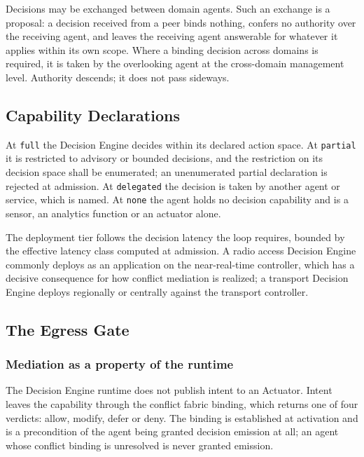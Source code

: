 Decisions may be exchanged between domain agents. Such an exchange is a
proposal: a decision received from a peer binds nothing, confers no
authority over the receiving agent, and leaves the receiving agent
answerable for whatever it applies within its own scope. Where a binding
decision across domains is required, it is taken by the overlooking
agent at the cross-domain management level. Authority descends; it does
not pass sideways.

\hypertarget{capability-declarations-2}{%
\subsection{Capability Declarations}\label{capability-declarations-2}}

At \texttt{full} the Decision Engine decides within its declared action
space. At \texttt{partial} it is restricted to advisory or bounded
decisions, and the restriction on its decision space shall be
enumerated; an unenumerated partial declaration is rejected at
admission. At \texttt{delegated} the decision is taken by another agent
or service, which is named. At \texttt{none} the agent holds no decision
capability and is a sensor, an analytics function or an actuator alone.

The deployment tier follows the decision latency the loop requires,
bounded by the effective latency class computed at admission. A radio
access Decision Engine commonly deploys as an application on the
near-real-time controller, which has a decisive consequence for how
conflict mediation is realized; a transport Decision Engine deploys
regionally or centrally against the transport controller.

\hypertarget{the-egress-gate}{%
\subsection{The Egress Gate}\label{the-egress-gate}}

\hypertarget{mediation-as-a-property-of-the-runtime}{%
\subsubsection{Mediation as a property of the runtime}\label{mediation-as-a-property-of-the-runtime}}

The Decision Engine runtime does not publish intent to an Actuator.
Intent leaves the capability through the conflict fabric binding, which
returns one of four verdicts: allow, modify, defer or deny. The binding
is established at activation and is a precondition of the agent being
granted decision emission at all; an agent whose conflict binding is
unresolved is never granted emission.


